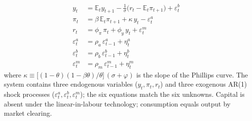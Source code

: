 \begin{align}
  y_{t}    &= \mathbb{E}_{t} y_{t+1} - \frac{1}{\sigma}\bigl(r_{t} - \mathbb{E}_{t}\pi_{t+1}\bigr) + \varepsilon_{t}^{b}
              \label{eq:nk-is} \\
  \pi_{t}  &= \beta\, \mathbb{E}_{t}\pi_{t+1} + \kappa\, y_{t} - \varepsilon_{t}^{a}
              \label{eq:nk-nkpc} \\
  r_{t}    &= \phi_{\pi}\, \pi_{t} + \phi_{y}\, y_{t} + \varepsilon_{t}^{m}
              \label{eq:nk-taylor} \\
  \varepsilon_{t}^{a} &= \rho_{a}\, \varepsilon_{t-1}^{a} + \eta_{t}^{a}
              \label{eq:nk-ar-a} \\
  \varepsilon_{t}^{b} &= \rho_{b}\, \varepsilon_{t-1}^{b} + \eta_{t}^{b}
              \label{eq:nk-ar-b} \\
  \varepsilon_{t}^{m} &= \rho_{m}\, \varepsilon_{t-1}^{m} + \eta_{t}^{m}
              \label{eq:nk-ar-m}
\end{align}
where $\kappa\equiv\bigl[(1-\theta)(1-\beta\theta)/\theta\bigr]\,(\sigma+\varphi)$
is the slope of the Phillips curve. The system contains three endogenous
variables ($y_{t},\pi_{t},r_{t}$) and three exogenous AR(1) shock
processes ($\varepsilon_{t}^{a},\varepsilon_{t}^{b},\varepsilon_{t}^{m}$);
the six equations match the six unknowns. Capital is absent under the
linear-in-labour technology; consumption equals output by market
clearing.
